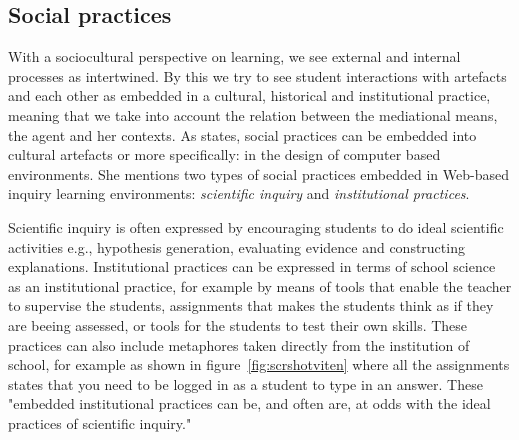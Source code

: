 \subsection{Social practices}
With a sociocultural perspective on learning, we see external and internal processes as intertwined. By this we try to see student interactions with artefacts and each other as embedded in a cultural, historical and institutional practice, meaning that we take into account the relation between the mediational means, the agent and her contexts. As \citet{furberg2009socio} states, social practices can be embedded into cultural artefacts or more specifically: in the design of computer based environments. She mentions two types of social practices embedded in Web-based inquiry learning environments: \emph{scientific inquiry} and \emph{institutional practices}.  

Scientific inquiry is often expressed by encouraging students to do ideal scientific activities e.g., hypothesis generation, evaluating evidence and constructing explanations. Institutional practices can be expressed in terms of school science as an institutional practice, for example by means of tools that enable the teacher to supervise the students, assignments that makes the students think as if they are beeing assessed, or tools for the students to test their own skills. These practices can also include metaphores taken directly from the institution of school, for example as shown in figure~\ref{fig:scrshotviten} where all the assignments states that you need to be logged in as a student to type in an answer. These "embedded institutional practices can be, and often are, at odds with the ideal practices of scientific inquiry." \citetext{\citealp{chinn2002epistemologically}, referenced in \citealp{furberg2009socio}, p. 400}

